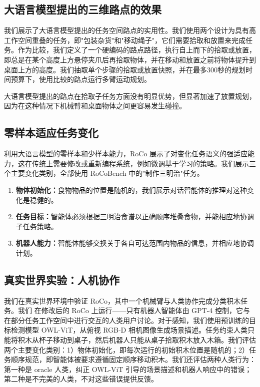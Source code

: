 \documentclass[UTF8, a4paper, 12pt]{article}
\begin{document}
\subsection{大语言模型提出的三维路点的效果}

我们展示了大语言模型提出的任务空间路点的实用性。我们使用两个设计为具有高工作空间重叠的任务，即"包装杂货"和"移动绳子"，它们需要拾取和放置来完成任务。作为比较，我们定义了一个硬编码的路点路径，执行自上而下的拾取或放置，即总是在某个高度上方悬停夹爪后再拾取物体，并在移动和放置之前将物体提升到桌面上方的高度。我们抽取单个步骤的拾取或放置快照，并在最多300秒的规划时间预算下，使用比较的路点运行多臂运动规划。

大语言模型提出的路点在拾取子任务方面没有明显优势，但显著加速了放置规划，因为在这种情况下机械臂和桌面物体之间更容易发生碰撞。

\subsection{零样本适应任务变化}

利用大语言模型的零样本和少样本能力，RoCo 展示了对变化任务语义的强适应能力，这在传统上需要修改或重新编程系统，例如微调基于学习的策略。我们展示三个主要变化类别，全部使用 RoCoBench 中的"制作三明治"任务。

\begin{enumerate}
    \item \textbf{物体初始化：}食物物品的位置是随机的，我们展示对话智能体的推理对这种变化是稳健的。
    \item \textbf{任务目标：}智能体必须根据三明治食谱以正确顺序堆叠食物，并能相应地协调子任务策略。
    \item \textbf{机器人能力：}智能体能够交换关于各自可达范围内物品的信息，并相应地协调计划。
\end{enumerate}

\subsection{真实世界实验：人机协作}

我们在真实世界环境中验证 RoCo，其中一个机械臂与人类协作完成分类积木任务。我们 在修改后的 RoCo 上运行——只有机器人智能体由 GPT-4 控制，它与在部分任务工作空间中进行交互的人类用户讨论。对于感知，我们使用预训练的目标检测模型 OWL-ViT，从俯视 RGB-D 相机图像生成场景描述。任务约束人类只能将积木从杯子移动到桌子，然后机器人只能从桌子拾取积木放入木箱。我们评估两个主要变化类别：1）物体初始化，即每次运行的初始积木位置是随机的；2）任务顺序规范，即智能体被要求遵循固定顺序移动积木。我们还评估两种人类行为：第一种是 oracle 人类，纠正 OWL-ViT 引导的场景描述和机器人响应中的错误；第二种是不完美的人类，不对这些错误提供反馈。
\end{document}
